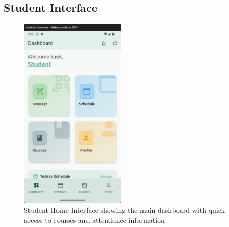 \subsection{Student Interface}\nopagebreak[4]
\vspace{0.5cm}
\begin{figure}[H]
    \centering
    \includegraphics[width=0.45\textwidth]{images/rachid/student-side-homepage.png}
    \caption{Student Home Interface showing the main dashboard with quick access to courses and attendance information}
    \label{fig:student-home}
\end{figure}

